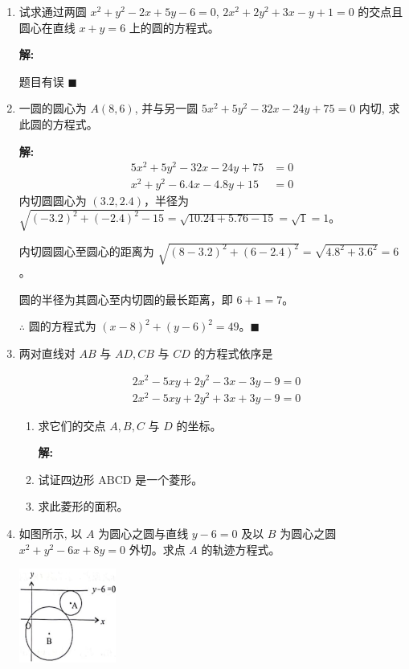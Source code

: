 \documentclass[10pt]{article}
\newcommand{\sol}{\textbf{解:} }
\begin{document}
\begin{enumerate}[leftmargin=*]
        \sol{}

        题目有误 \hfill$\blacksquare$

  \item 试求通过两圆 $x^{2}+y^{2}-2 x+5 y-6=0$, $2 x^{2}+2 y^{2}+3 x-y+1=0$ 的交点且圆心在直线 $x+y=6$ 上的圆的方程式。

        \sol{}

        题目有误 \hfill$\blacksquare$


  \item 一圆的圆心为 $A(8,6)$, 并与另一圆 $5 x^{2}+5 y^{2}-32 x-24 y+75=0$ 内切, 求此圆的方程式。

        \sol{}
        \begin{align*}
          5 x^{2}+5 y^{2}-32 x-24 y+75 & = 0 \\
          x^{2}+y^{2}-6.4 x-4.8 y+15   & = 0
        \end{align*}
        内切圆圆心为 $(3.2, 2.4)$，半径为 $\sqrt{(-3.2)^2 + (-2.4)^2 - 15} = \sqrt{10.24 + 5.76 - 15} = \sqrt{1} = 1$。

        内切圆圆心至圆心的距离为 $\sqrt{(8-3.2)^2 + (6-2.4)^2} = \sqrt{4.8^2 + 3.6^2} = 6$。

        圆的半径为其圆心至内切圆的最长距离，即 $6 + 1 = 7$。

        $\therefore$ 圆的方程式为 $(x-8)^{2} + (y-6)^{2} = 49$。\hfill$\blacksquare$

  \item 两对直线对 $AB$ 与 $AD, CB$ 与 $CD$ 的方程式依序是

        $$
          \begin{aligned}
             & 2 x^{2}-5 x y+2 y^{2}-3 x-3 y-9=0 \\
             & 2 x^{2}-5 x y+2 y^{2}+3 x+3 y-9=0
          \end{aligned}
        $$

        \begin{enumerate}
          \item 求它们的交点 $A, B, C$ 与 $D$ 的坐标。

                \sol{}

          \item 试证四边形 $\mathrm{ABCD}$ 是一个菱形。

          \item 求此菱形的面积。
        \end{enumerate}

  \item 如图所示, 以 $A$ 为圆心之圆与直线 $y-6=0$ 及以 $B$ 为圆心之圆 $x^{2}+y^{2}-6 x+8 y=0$ 外切。求点 $A$ 的轨迹方程式。
        \begin{center}
          \includegraphics[max width=0.25\textwidth]{2024_06_07_f484519cd4dc635602b3g-04}
        \end{center}


\end{enumerate}
\end{document}
